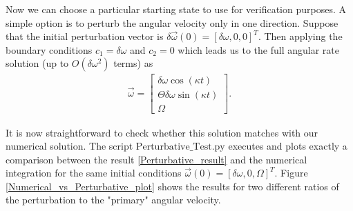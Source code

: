 \documentclass[a4paper]{article}
\begin{document}
	Now we can choose a particular starting state to use for verification purposes.
	A simple option is to perturb the angular velocity only in one direction.
	Suppose that the initial perturbation vector is $\delta \vec{\omega}( 0 ) = [ \delta \omega , 0 , 0 ]^T$.
	Then applying the boundary conditions $c_1 = \delta \omega$ and $c_2 = 0$ which leads us to the full angular rate solution (up to $O(\delta \omega^2)$ terms) as
	\begin{eqnarray}\label{Perturbative_result}
		\vec{\omega} = 
		\begin{bmatrix}
				\delta \omega \cos( \kappa t ) \\
				\Theta \delta \omega \sin( \kappa t ) \\
				\Omega
		\end{bmatrix}.
	\end{eqnarray}

	It is now straightforward to check whether this solution matches with our numerical solution.
	The script $\mathrm{Perturbative\_Test.py}$ executes and plots exactly a comparison between the result \eqref{Perturbative_result} and the numerical integration for the same initial conditions $\vec{\omega}( 0 ) = [ \delta \omega , 0 , \Omega ]^T$.
	Figure \ref{Numerical_vs_Perturbative_plot} shows the results for two different ratios of the perturbation to the "primary" angular velocity.
\end{document}
